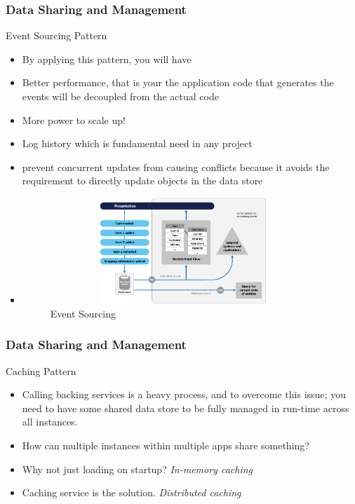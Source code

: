 \documentclass{beamer}
\begin{document}
	\begin{frame}
	\frametitle{Data Sharing and Management}
		Event Sourcing Pattern
		\begin{itemize}
			\item<1->[] \scriptsize{By applying this pattern, you will have}
			\vspace{1mm}
			\item<2-> \scriptsize{Better performance, that is your the application code that generates the events will be decoupled from the actual code}
			\item<3-> \scriptsize{More power to scale up!}
			\item<4-> \scriptsize{Log history which is fundamental need in any project}
			\item<5-> \scriptsize{prevent concurrent updates from causing conflicts because it avoids the requirement to directly update objects in the data store}
			\item<1->[]
			\begin{figure}[h]
				\includegraphics[width=100mm,height= 40mm, scale=1]{img/event-sourcing-overview.png}
				\caption{Event Sourcing}
			\end{figure}
		\end{itemize}
	\end{frame}

	\begin{frame}
	\frametitle{Data Sharing and Management}
		Caching Pattern
		\begin{itemize}
			\item<1->[] \scriptsize{Calling backing services is a heavy process, and to overcome this issue; you need to have some shared data store to be fully managed in run-time across all instances.}
			\vspace{1mm}
			\item<2-> \scriptsize{How can multiple instances within multiple apps share something?}
			\item<3-> \scriptsize{Why not just loading on startup? \textit{In-memory caching}}
			\item<4-> \scriptsize{Caching service is the solution. \textit{Distributed caching}}
		\end{itemize}
	\vspace{100mm}
	\end{frame}
\end{document}
